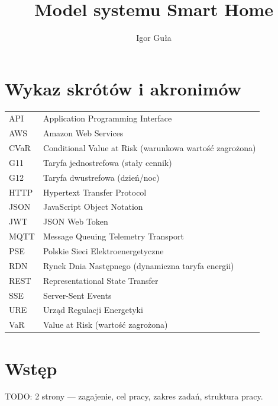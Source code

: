 \documentclass[12pt,twoside]{article}
\author{Igor Guła}
\title{Model systemu Smart Home}
\begin{document}
\maketitle

\blankpage

\tableofcontents

\clearpage
\blankpage


\section*{Wykaz skrótów i akronimów}

\begin{tabular}{ll}
API      & Application Programming Interface \\
AWS      & Amazon Web Services \\
CVaR     & Conditional Value at Risk (warunkowa wartość zagrożona) \\
G11      & Taryfa jednostrefowa (stały cennik) \\
G12      & Taryfa dwustrefowa (dzień/noc) \\
HTTP     & Hypertext Transfer Protocol \\
JSON     & JavaScript Object Notation \\
JWT      & JSON Web Token \\
MQTT     & Message Queuing Telemetry Transport \\
PSE      & Polskie Sieci Elektroenergetyczne \\
RDN      & Rynek Dnia Następnego (dynamiczna taryfa energii) \\
REST     & Representational State Transfer \\
SSE      & Server-Sent Events \\
URE      & Urząd Regulacji Energetyki \\
VaR      & Value at Risk (wartość zagrożona) \\
\end{tabular}


\section{Wstęp}

TODO: 2 strony — zagajenie, cel pracy, zakres zadań, struktura pracy.
\end{document}
